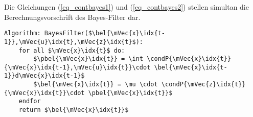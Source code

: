 Die Gleichungen (\ref{eq_contbayes1}) und (\ref{eq_contbayes2}) stellen simultan die Berechnungsvorschrift des Bayes-Filter dar.
\begin{lstlisting}[mathescape=true, caption={Bayes-Filter}]
Algorithm: BayesFilter($\bel{\mVec{x}\idx{t-1}},\mVec{u}\idx{t},\mVec{z}\idx{t}$):
	for all $\mVec{x}\idx{t}$ do:
		$\pbel{\mVec{x}\idx{t}} = \int \condP{\mVec{x}\idx{t}}{\mVec{x}\idx{t-1},\mVec{u}\idx{t}}\cdot \bel{\mVec{x}\idx{t-1}}d\mVec{x}\idx{t-1}$
		$\bel{\mVec{x}\idx{t}} = \mu \cdot \condP{\mVec{z}\idx{t}}{\mVec{x}\idx{t}}\cdot \pbel{\mVec{x}\idx{t}}$
	endfor
	return $\bel{\mVec{x}\idx{t}}$
\end{lstlisting}